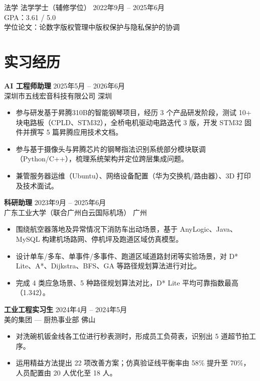 \documentclass[10pt,a4paper]{article}
\newcommand{\resumeItem}[1]{\item #1}
\newcommand{\experienceEntry}[4]{%
  \textbf{#1} \hfill #2 \\
  {\small #3} \hfill {\small #4}%
}
\begin{document}
\vspace{1pt}

{\small 法学 法学学士（辅修学位）} \hfill 2022年9月 -- 2025年6月 \\
{\small GPA：3.61 / 5.0} \\
{\small 学位论文：论数字版权管理中版权保护与隐私保护的协调}

\section{实习经历}

\experienceEntry{AI 工程师助理}{2025年5月 -- 2026年6月}{深圳市五线宏音科技有限公司}{深圳}
\begin{itemize}
  \resumeItem{参与研发基于昇腾310B的智能钢琴项目，经历 3 个产品研发阶段，测试 10+ 块电路板（CPLD、STM32），全桥电机驱动电路迭代 3 版，开发 STM32 固件并撰写 5 篇昇腾应用技术文档。}
  \resumeItem{参与基于摄像头与昇腾芯片的钢琴指法识别系统部分模块联调（Python/C++），梳理系统架构并定位跨层集成问题。}
  \resumeItem{兼管服务器运维（Ubuntu）、网络设备配置（华为交换机/路由器）、3D 打印及技术面试。}
\end{itemize}

\vspace{2pt}

\experienceEntry{科研助理}{2023年9月 -- 2025年6月}{广东工业大学（联合广州白云国际机场）}{广州}
\begin{itemize}
  \resumeItem{围绕航空器落地及异常情况下消防车出动场景，基于 AnyLogic、Java、MySQL 构建机场路网、停机坪及跑道区域仿真模型。}
  \resumeItem{设计单车/多车、单事件/多事件、跑道区域道路封闭等实验场景，对 D* Lite、A*、Dijkstra、BFS、GA 等路径规划算法进行对比。}
  \resumeItem{完成 4 类应急场景、5 种路径规划算法对比，D* Lite 平均可靠指数最高（1.342）。}
\end{itemize}

\vspace{2pt}

\experienceEntry{工业工程实习生}{2024年4月 -- 2024年5月}{美的集团 — 厨热事业部}{佛山}
\begin{itemize}
  \resumeItem{对洗碗机钣金线各工位进行秒表测时，形成员工负荷表，识别出 5 道超节拍工序。}
  \resumeItem{运用精益方法提出 22 项改善方案；仿真验证线平衡率由 58\% 提升至 70\%，人员配置由 20 人优化至 18 人。}
\end{itemize}

\vspace{2pt}
\end{document}
